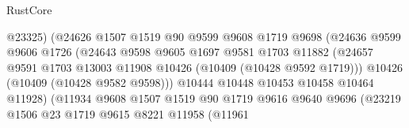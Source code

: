 \begin{lexlean}{RustCore}
\begin{coremodule}
                                        @23325)
                                      (@24626
                                        @1507
                                        @1519
                                        @90
                                        @9599
                                        @9608
                                        @1719
                                        @9698
                                        (@24636
                                          @9599
                                          @9606
                                          @1726
                                          (@24643
                                            @9598
                                            @9605
                                            @1697
                                            @9581
                                            @1703
                                            @11882
                                            (@24657
                                              @9591
                                              @1703
                                              @13003
                                              @11908
                                              @10426
                                              (@10409 (@10428 @9592 @1719)))
                                            @10426
                                            (@10409 (@10428 @9582 @9598)))
                                          @10444
                                          @10448
                                          @10453
                                          @10458
                                          @10464
                                          @11928)
                                        (@11934
                                          @9608
                                          @1507
                                          @1519
                                          @90
                                          @1719
                                          @9616
                                          @9640
                                          @9696
                                          (@23219
                                            @1506
                                            @23
                                            @1719
                                            @9615
                                            @8221
                                            @11958
                                            (@11961

\end{coremodule}
\end{lexlean}
